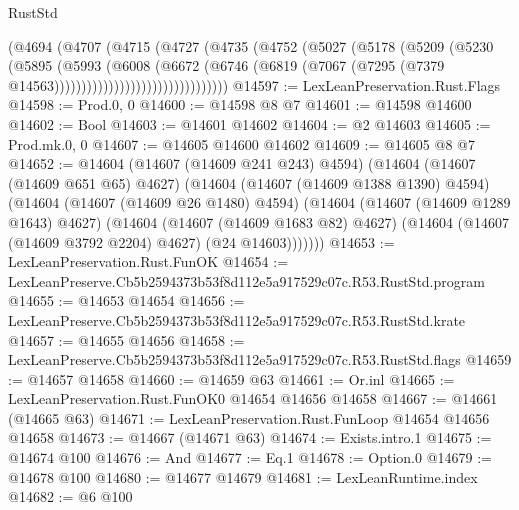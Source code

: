 \begin{lexlean}{RustStd}
\begin{coremodule}
                              (@4694
                                (@4707
                                  (@4715
                                    (@4727
                                      (@4735
                                        (@4752
                                          (@5027
                                            (@5178
                                              (@5209
                                                (@5230
                                                  (@5895
                                                    (@5993
                                                      (@6008
                                                        (@6672
                                                          (@6746
                                                            (@6819
                                                              (@7067
                                                                (@7295
                                                                  (@7379
                                                                    @14563))))))))))))))))))))))))))))))))
@14597 := LexLeanPreservation.Rust.Flags
@14598 := Prod.{0, 0}
@14600 := @14598 @8 @7
@14601 := @14598 @14600
@14602 := Bool
@14603 := @14601 @14602
@14604 := @2 @14603
@14605 := Prod.mk.{0, 0}
@14607 := @14605 @14600 @14602
@14609 := @14605 @8 @7
@14652 := @14604
    (@14607 (@14609 @241 @243) @4594)
    (@14604
      (@14607 (@14609 @651 @65) @4627)
      (@14604
        (@14607 (@14609 @1388 @1390) @4594)
        (@14604
          (@14607 (@14609 @26 @1480) @4594)
          (@14604
            (@14607 (@14609 @1289 @1643) @4627)
            (@14604
              (@14607 (@14609 @1683 @82) @4627)
              (@14604 (@14607 (@14609 @3792 @2204) @4627) (@24 @14603)))))))
@14653 := LexLeanPreservation.Rust.FunOK
@14654 := LexLeanPreserve.Cb5b2594373b53f8d112e5a917529c07c.R53.RustStd.program
@14655 := @14653 @14654
@14656 := LexLeanPreserve.Cb5b2594373b53f8d112e5a917529c07c.R53.RustStd.krate
@14657 := @14655 @14656
@14658 := LexLeanPreserve.Cb5b2594373b53f8d112e5a917529c07c.R53.RustStd.flags
@14659 := @14657 @14658
@14660 := @14659 @63
@14661 := Or.inl
@14665 := LexLeanPreservation.Rust.FunOK0 @14654 @14656 @14658
@14667 := @14661 (@14665 @63)
@14671 := LexLeanPreservation.Rust.FunLoop @14654 @14656 @14658
@14673 := @14667 (@14671 @63)
@14674 := Exists.intro.{1}
@14675 := @14674 @100
@14676 := And
@14677 := Eq.{1}
@14678 := Option.{0}
@14679 := @14678 @100
@14680 := @14677 @14679
@14681 := LexLeanRuntime.index
@14682 := @6 @100

\end{coremodule}
\end{lexlean}
